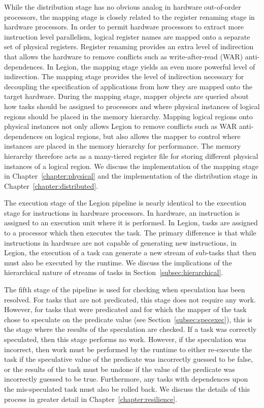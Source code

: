 While the distribution stage has no obvious analog in
hardware out-of-order processors, the mapping stage
is closely related to the register renaming stage in
hardware processors. In order to permit hardware
processors to extract more instruction level parallelism, 
logical register names are mapped onto a separate set of 
physical registers. Register renaming 
provides an extra level of indirection that allows the 
hardware to remove conflicts such as write-after-read (WAR)
anti-dependences. In Legion, the mapping stage yields
an even more powerful level of indirection. The mapping
stage provides the level of indirection necessary for
decoupling the specification of applications from how
they are mapped onto the target hardware.  During the
mapping stage, mapper objects are queried about how
tasks should be assigned to processors and where physical
instances of logical regions should be placed in the
memory hierarchy. Mapping logical regions onto physical
instances not only allows Legion to remove conflicts
such as WAR anti-dependences on logical regions, but also
allows the mapper to control where instances are placed
in the memory hierarchy for performance. The memory
hierarchy therefore acts as a many-tiered register file
for storing different physical instances of a logical
region. We discuss the implementation of the mapping
stage in Chapter~\ref{chapter:physical} and the 
implementation of the distribution stage in
Chapter~\ref{chapter:distributed}.

The execution stage of the Legion pipeline is nearly
identical to the execution stage for instructions
in hardware processors. In hardware, an instruction
is assigned to an execution unit where it is performed.
In Legion, tasks are assigned to a processor which
then executes the task. The primary difference is
that while instructions in hardware are not capable
of generating new instructions, in Legion, the execution
of a task can generate a new stream of sub-tasks
that then must also be executed by the runtime.
We discuss the implications of the hierarchical
nature of streams of tasks in 
Section~\ref{subsec:hierarchical}.

The fifth stage of the pipeline is used for checking
when speculation has been resolved.  For tasks that 
are not predicated, this stage does not require any
work.  However, for tasks that were predicated and for
which the mapper of the task chose to speculate on
the predicate value (see Section~\ref{subsec:specexec}),
this is the stage where the results of the speculation
are checked.  If a task was correctly speculated, then
this stage performs no work.  However, if the speculation
was incorrect, then work must be performed by the runtime
to either re-execute the task if the speculative value 
of the predicate was incorrectly guessed to be false, 
or the results of the task must be undone if the value 
of the predicate was incorrectly guessed to be true.  
Furthermore, any tasks with dependences upon the 
mis-speculated task must also be rolled back. We 
discuss the details of this process in greater detail 
in Chapter~\ref{chapter:resilience}.


